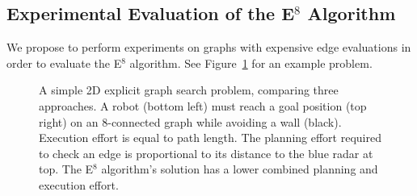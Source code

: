 \subsection{Experimental Evaluation of the E$^8$ Algorithm}

We propose to perform experiments on graphs with
expensive edge evaluations
in order to evaluate the E$^8$ algorithm.
See Figure~\ref{fig:e8-results} for an example problem.

\begin{figure}[t]
   \centering
   
   
   
   
   \quad
   \vspace{0.05in}
   \quad
   
   \caption{A simple 2D explicit graph search problem,
      comparing three approaches.
      A robot (bottom left) must reach a goal position (top right)
      on an 8-connected graph
      while avoiding a wall (black).
      Execution effort is equal to path length.
      The planning effort required to check an edge is proportional
      to its distance to the blue radar at top.
      The E$^8$ algorithm's solution has a lower combined
      planning and execution effort.}
   \label{fig:e8-results}
\end{figure}

